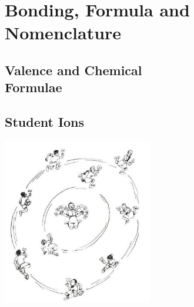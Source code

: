 \section{Bonding, Formula and Nomenclature}

\begin{multicols}{2}


\section*{Valence and Chemical \hfill \\ Formulae}


\subsection{Student Ions}

\begin{center}
\includegraphics[width=0.49\textwidth]{./img/source/student-ions.jpg}
\end{center}


\end{multicols}
